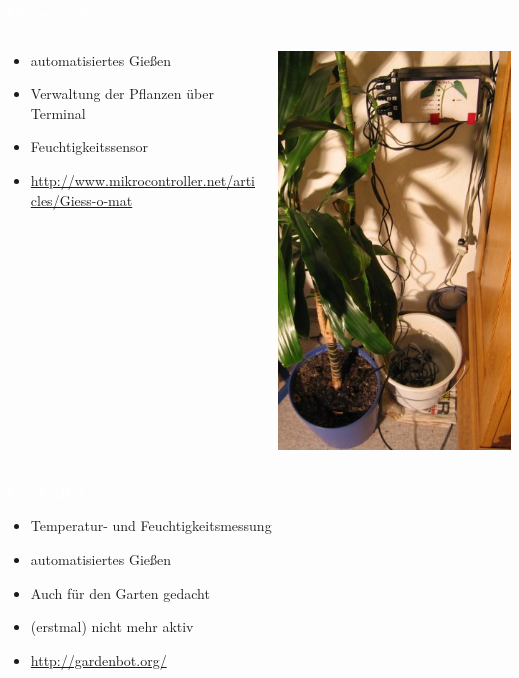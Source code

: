 \documentclass[bigger]{beamer}
\newcommand{\topic}[1]{{\huge{\textcolor{white}{\textbf{#1}}}}}
\begin{document}
\begin{frame}{\topic{Giess-o-mat}}
	\begin{columns}[T]
		\begin{column}{.5\textwidth}
			\begin{itemize}
				\item automatisiertes Gießen
				\item Verwaltung der Pflanzen über Terminal
				\item Feuchtigkeitssensor
				\item \url{http://www.mikrocontroller.net/articles/Giess-o-mat}
			\end{itemize}
		\end{column}
		\begin{column}{.5\textwidth}
			\includegraphics[width=0.55\linewidth]{Giessomat.jpg}
		\end{column}
	\end{columns}
\end{frame}

\begin{frame}{\topic{GardenBot}}
	\begin{itemize}
		\item Temperatur- und Feuchtigkeitsmessung
		\item automatisiertes Gießen
		\item Auch für den Garten gedacht
		\item (erstmal) nicht mehr aktiv
		\item \url{http://gardenbot.org/}
	\end{itemize}
\end{frame}
\end{document}
